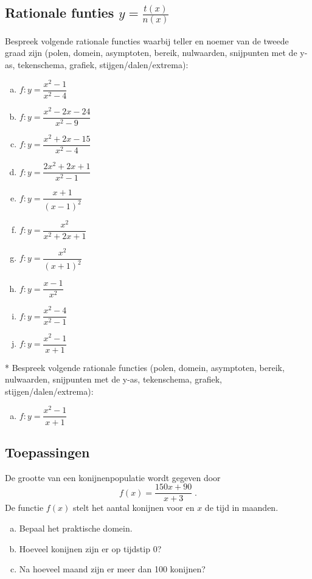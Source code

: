 \documentclass[a4paper,12pt]{article}
\begin{document}
\subsection{Rationale funties $y=\frac{t(x)}{n(x)}$}

\begin{oefening}
Bespreek volgende rationale functies waarbij teller en noemer van de tweede graad zijn (polen, domein, asymptoten, bereik, nulwaarden, snijpunten met de y-as, tekenschema, grafiek, stijgen/dalen/extrema):
\begin{multicols}{2}
\begin{enumerate}[(a)]
  \itemsep0.6em
  \item $f:y=\dfrac{x^2-1}{x^2-4}$
  \item $f:y=\dfrac{x^2-2x-24}{x^2-9}$
  \item $f:y=\dfrac{x^2+2x-15}{x^2-4}$
  \item $f:y=\dfrac{2x^2+2x+1}{x^2-1}$
  \item $f:y=\dfrac{x+1}{(x-1)^2}$
  \item $f:y=\dfrac{x^2}{x^2+2x+1}$
  \item $f:y=\dfrac{x^2}{(x+1)^2}$
  \item $f:y=\dfrac{x-1}{x^2}$
  \item $f:y=\dfrac{x^2-4}{x^2-1}$
  \item $f:y=\dfrac{x^2-1}{x+1}$
\end{enumerate}
\end{multicols}
\end{oefening}

\begin{oefening}*
Bespreek volgende rationale functies (polen, domein, asymptoten, bereik, nulwaarden, snijpunten met de y-as, tekenschema, grafiek, stijgen/dalen/extrema):\\
\begin{enumerate}[(a)]
  \itemsep0.6em
  \item $f:y=\dfrac{x^2-1}{x+1}$
\end{enumerate}
\end{oefening}

\subsection{Toepassingen}


\begin{oefening}
De grootte van een konijnenpopulatie wordt gegeven door
$$f(x)=\dfrac{150x+90}{x+3}\;.$$
De functie $f(x)$ stelt het aantal konijnen voor en $x$ de tijd in maanden.
\begin{enumerate}[(a)]
  \item Bepaal het praktische domein.
  \item Hoeveel konijnen zijn er op tijdstip 0?
  \item Na hoeveel maand zijn er meer dan 100 konijnen?
\end{enumerate}
\end{oefening}
\end{document}
